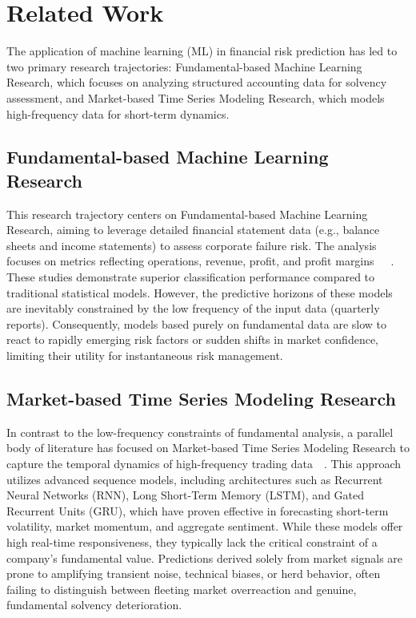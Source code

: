 \section{Related Work}
\label{sec:related work}
The application of machine learning (ML) in financial risk prediction has led to two primary research trajectories: Fundamental-based Machine Learning Research, which focuses on analyzing structured accounting data for solvency assessment, and Market-based Time Series Modeling Research, which models high-frequency data for short-term dynamics.

\subsection{Fundamental-based Machine Learning Research}
This research trajectory centers on Fundamental-based Machine Learning Research, aiming to leverage detailed financial statement data (e.g., balance sheets and income statements) to assess corporate failure risk. The analysis focuses on metrics reflecting operations, revenue, profit, and profit margins~\cite{gu2020empirical}~\cite{ahbali2022identifying}~\cite{wang2023sparsity}. These studies demonstrate superior classification performance compared to traditional statistical models. However, the predictive horizons of these models are inevitably constrained by the low frequency of the input data (quarterly reports). Consequently, models based purely on fundamental data are slow to react to rapidly emerging risk factors or sudden shifts in market confidence, limiting their utility for instantaneous risk management.

\subsection{Market-based Time Series Modeling Research}
In contrast to the low-frequency constraints of fundamental analysis, a parallel body of literature has focused on Market-based Time Series Modeling Research to capture the temporal dynamics of high-frequency trading data~\cite{random_forest}~\cite{svm}. This approach utilizes advanced sequence models, including architectures such as Recurrent Neural Networks (RNN), Long Short-Term Memory (LSTM), and Gated Recurrent Units (GRU), which have proven effective in forecasting short-term volatility, market momentum, and aggregate sentiment. While these models offer high real-time responsiveness, they typically lack the critical constraint of a company's fundamental value. Predictions derived solely from market signals are prone to amplifying transient noise, technical biases, or herd behavior, often failing to distinguish between fleeting market overreaction and genuine, fundamental solvency deterioration.

